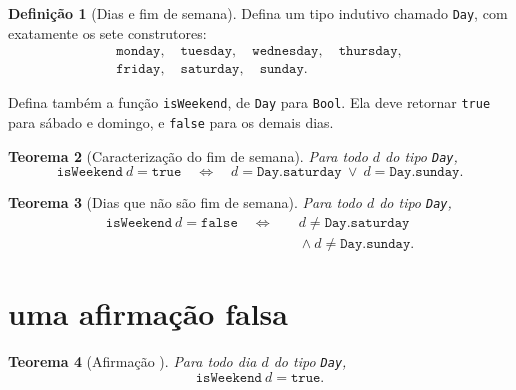 \documentclass[11pt,a4paper]{article}
\theoremstyle{definition}
\newtheorem{definition}{Definição}[section]
\theoremstyle{plain}
\newtheorem{theorem}[definition]{Teorema}
\begin{document}
\begin{definition}[Dias e fim de semana]
\label{isWeekend}
Defina um tipo indutivo chamado \texttt{Day}, com exatamente
os sete construtores:
\[
\begin{gathered}
\texttt{monday},\quad \texttt{tuesday},\quad
\texttt{wednesday},\quad \texttt{thursday},\\
\texttt{friday},\quad \texttt{saturday},\quad
\texttt{sunday}.
\end{gathered}
\]

Defina também a função \texttt{isWeekend},
de \texttt{Day} para \texttt{Bool}.
Ela deve retornar \texttt{true} para sábado e domingo,
e \texttt{false} para os demais dias.
\end{definition}

\begin{theorem}[Caracterização do fim de semana]
\label{isWeekend_iff}
Para todo $d$ do tipo \texttt{Day},
\[
  \texttt{isWeekend}\ d=\texttt{true}
  \quad\Longleftrightarrow\quad
  d=\texttt{Day.saturday}
  \ \lor\
  d=\texttt{Day.sunday}.
\]
\end{theorem}

\begin{theorem}[Dias que não são fim de semana]
\label{notWeekend_iff}
Para todo $d$ do tipo \texttt{Day},
\[
\begin{aligned}
  \texttt{isWeekend}\ d=\texttt{false}
  \quad\Longleftrightarrow\quad
  &d\ne\texttt{Day.saturday}\\
  &{}\land d\ne\texttt{Day.sunday}.
\end{aligned}
\]
\end{theorem}

\section{ uma afirmação falsa}

\begin{theorem}[Afirmação ]
\label{every_day_weekend}
Para todo dia $d$ do tipo \texttt{Day},
\[
  \texttt{isWeekend}\ d=\texttt{true}.
\]
\end{theorem}
\end{document}
